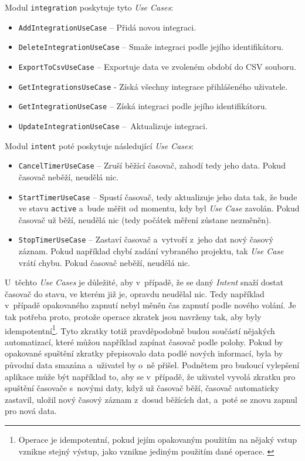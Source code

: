Modul \texttt{integration} poskytuje tyto \emph{Use Cases}:
\begin{itemize}
\item\texttt{AddIntegrationUseCase} – Přidá novou integraci.
\item\texttt{DeleteIntegrationUseCase} – Smaže integraci podle jejího identifikátoru.
\item\texttt{ExportToCsvUseCase} – Exportuje data ve zvoleném období do CSV souboru.
\item\texttt{GetIntegrationsUseCase} - Získá všechny integrace přihlášeného uživatele.
\item\texttt{GetIntegrationUseCase} – Získá integraci podle jejího identifikátoru.
\item\texttt{UpdateIntegrationUseCase} – Aktualizuje integraci.
\end{itemize}
Modul \texttt{intent} poté poskytuje následující \emph{Use Cases}:
\begin{itemize}
\item\texttt{CancelTimerUseCase} – Zruší běžící časovač, zahodí tedy jeho data. Pokud časovač neběží, neudělá nic.
\item\texttt{StartTimerUseCase} – Spustí časovač, tedy aktualizuje jeho data tak, že bude ve stavu \texttt{active} a~bude měřit od momentu, kdy byl \emph{Use Case} zavolán. Pokud časovač už běží, neudělá nic (tedy počátek měření zůstane nezměněn).
\item\texttt{StopTimerUseCase} – Zastaví časovač a~vytvoří z~jeho dat nový časový záznam. Pokud například chybí zadání vybraného projektu, tak \emph{Use Case} vrátí chybu. Pokud časovač neběží, neudělá nic.
\end{itemize}
U~těchto \emph{Use Cases} je důležité, aby v~případě, že se daný \emph{Intent} snaží dostat časovač do stavu, ve kterém již je, opravdu neudělal nic. Tedy například v~případě opakovaného zapnutí nebyl měněn čas zapnutí podle nového volání. Je tak potřeba proto, protože operace zkratek jsou navrženy tak, aby byly idempotentní\footnote{Operace je idempotentní, pokud jejím opakovaným použitím na nějaký vstup vznikne stejný výstup, jako vznikne jediným použitím dané operace. \cite{idempotence}}. Tyto zkratky totiž pravděpodobně budou součástí nějakých automatizací, které můžou například zapínat časovač podle polohy. Pokud by opakované spuštění zkratky přepisovalo data podlé nových informací, byla by původní data smazána a~uživatel by o~ně přišel. Podnětem pro budoucí vylepšení aplikace může být například to, aby se v~případě, že uživatel vyvolá zkratku pro spuštění časovače s~novými daty, když už časovač běží, časovač automaticky zastavil, uložil nový časový záznam z~dosud běžících dat, a~poté se znovu zapnul pro nová data.

